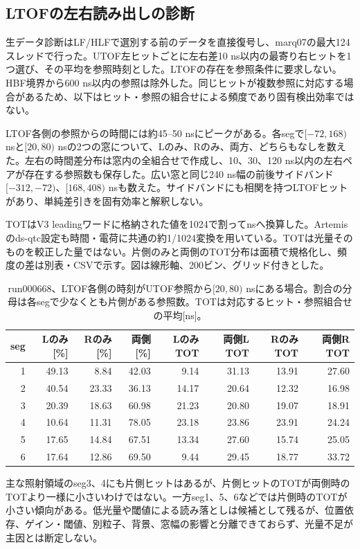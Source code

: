 \subsection{LTOFの左右読み出しの診断}
生データ診断はLF/HLFで選別する前のデータを直接復号し、marq07の最大124スレッドで行った。UTOF左ヒットごとに左右差10 ns以内の最寄り右ヒットを1つ選び、その平均を参照時刻とした。LTOFの存在を参照条件に要求しない。HBF境界から600 ns以内の参照は除外した。同じヒットが複数参照に対応する場合があるため、以下はヒット・参照の組合せによる頻度であり固有検出効率ではない。

LTOF各側の参照からの時間には約45--50 nsにピークがある。各segで$[-72,168)$ nsと$[20,80)$ nsの2つの窓について、Lのみ、Rのみ、両方、どちらもなしを数えた。左右の時間差分布は窓内の全組合せで作成し、10、30、120 ns以内の左右ペアが存在する参照数も保存した。広い窓と同じ240 ns幅の前後サイドバンド$[-312,-72)$、$[168,408)$ nsも数えた。サイドバンドにも相関を持つLTOFヒットがあり、単純差引きを固有効率と解釈しない。

TOTはV3 leadingワードに格納された値を1024で割ってnsへ換算した。Artemisのds-qtc設定も時間・電荷に共通の約1/1024変換を用いている。TOTは光量そのものを較正した量ではない。片側のみと両側のTOT分布は面積で規格化し、頻度の差は別表・CSVで示す。図は線形軸、200ビン、グリッド付きとした。
\begin{table}[H]\centering\small
\caption{run000668、LTOF各側の時刻がUTOF参照から$[20,80)$ nsにある場合。割合の分母は各segで少なくとも片側がある参照数。TOTは対応するヒット・参照組合せの平均[ns]。}
\begin{tabular}{rrrrrrrr}\hline
seg & Lのみ[\%] & Rのみ[\%] & 両側[\%] & LのみTOT & 両側L TOT & RのみTOT & 両側R TOT \\\hline
1 & 49.13 & 8.84 & 42.03 & 9.14 & 31.13 & 13.91 & 27.60 \\
2 & 40.54 & 23.33 & 36.13 & 14.17 & 20.64 & 12.32 & 16.98 \\
3 & 20.39 & 18.63 & 60.98 & 21.23 & 20.80 & 19.07 & 18.91 \\
4 & 10.64 & 11.31 & 78.05 & 23.18 & 23.86 & 23.91 & 24.24 \\
5 & 17.65 & 14.84 & 67.51 & 13.34 & 27.60 & 15.74 & 25.05 \\
6 & 17.64 & 12.86 & 69.50 & 9.44 & 29.45 & 18.77 & 33.72 \\
\hline\end{tabular}\end{table}

主な照射領域のseg3、4にも片側ヒットはあるが、片側ヒットのTOTが両側時のTOTより一様に小さいわけではない。一方seg1、5、6などでは片側時のTOTが小さい傾向がある。低光量や閾値による読み落としは候補として残るが、位置依存、ゲイン・閾値、別粒子、背景、窓幅の影響と分離できておらず、光量不足が主因とは断定しない。

